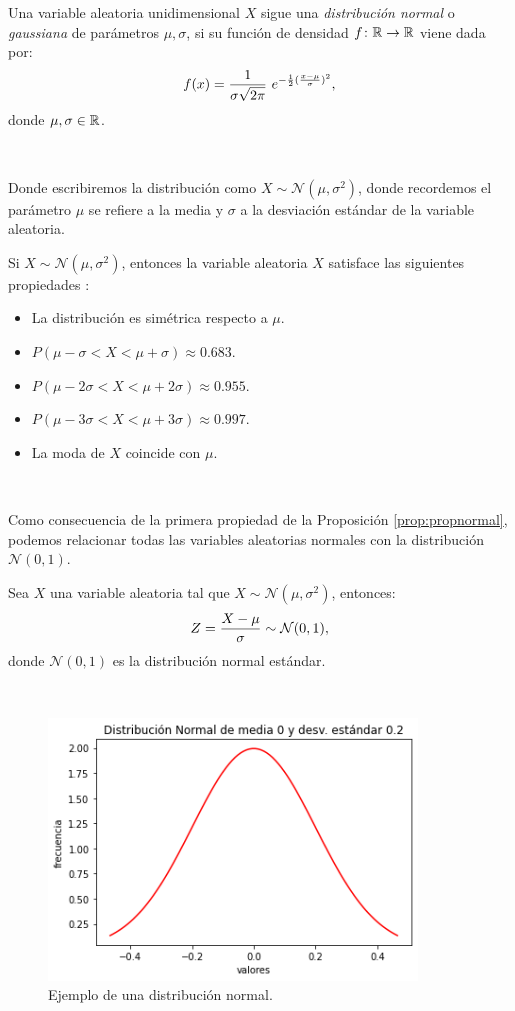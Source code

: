 \documentclass[oneside,openright,titlepage,numbers=noenddot,openany,headinclude,footinclude=true,
cleardoublepage=empty,abstractoff,BCOR=5mm,paper=a4,fontsize=12pt,main=spanish]{scrreprt}
\begin{document}
\begin{definition}
Una variable aleatoria unidimensional $X$ sigue una \textit{distribución normal} o \textit{gaussiana} de parámetros $\mu, \sigma$, si su función de densidad $f\colon \mathbb{R} \to \mathbb{R}$ viene dada por: $$f(x)=\ddfrac{1}{\sigma \sqrt{2\pi}} \ e^{-\frac{1}{2}(\frac{x-\mu}{\sigma})^2},$$
donde $\mu,\sigma\in \mathbb{R}$.
\end{definition}\

Donde escribiremos la distribución como $X \sim \mathcal{N}(\mu, \sigma^2)$, donde recordemos el parámetro $\mu$ se refiere a la media y $\sigma$ a la desviación estándar de la variable aleatoria.\\

\begin{proposition} \label{prop:propnormal}
Si $X \sim \mathcal{N}(\mu, \sigma^2)$, entonces la variable aleatoria $X$ satisface las siguientes propiedades :
\begin{itemize}
    \item La distribución es simétrica respecto a $\mu$.
    \item $P(\mu-\sigma < X < \mu+\sigma)\approx 0.683.$
    \item $P(\mu-2\sigma < X < \mu+2\sigma)\approx 0.955.$
    \item $P(\mu-3\sigma < X < \mu+3\sigma)\approx 0.997.$
    \item La moda de $X$ coincide con $\mu$.
\end{itemize}
\end{proposition}\

Como consecuencia de la primera propiedad de la Proposición \ref{prop:propnormal}, podemos relacionar todas las variables aleatorias normales con la distribución $\mathcal{N}(0,1)$.\\

\begin{proposition}
Sea $X$ una variable aleatoria tal que $X \sim \mathcal{N}(\mu, \sigma^2)$, entonces: $$Z=\frac{\displaystyle X-\mu}{\displaystyle \sigma} \sim \mathcal{N}(0,1),$$
donde $\mathcal{N}(0,1)$ es la distribución normal estándar.
\end{proposition}\

\begin{figure}[h]
	\centering
	\includegraphics[width=9.8cm]{distnormal.png}
	\caption{Ejemplo de una distribución normal.}
    \label{fig:distrnormal}
\end{figure}\
\end{document}
